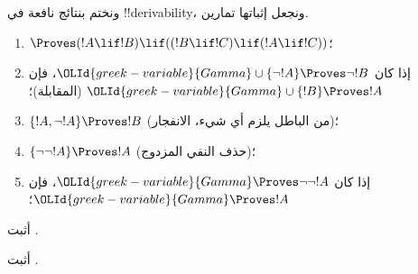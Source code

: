 \documentclass[../../../include/open-logic-section]{subfiles}
\begin{document}
ونختم بنتائج نافعة في !!{derivability}، ونجعل إثباتها تمارين.

\begin{prop}
\begin{enumerate}
\item $\Proves (!A \lif !B) \lif ((!B \lif !C)
  \lif (!A \lif !C))$؛ 
\item إذا كان $\OLId{greek-variable}{Gamma} \cup \{ \lnot !A\}
  \Proves \lnot !B$، فإن $\OLId{greek-variable}{Gamma} \cup \{ !B\} \Proves
  !A$ (المقابلة)؛ 
\item  $\{ !A, \lnot!A\} \Proves
    !B$ (من الباطل يلزم أي شيء، الانفجار)؛ 
\item  $\{ \lnot\lnot!A\} \Proves
  !A$ (حذف النفي المزدوج)؛
\item إذا كان $\OLId{greek-variable}{Gamma} \Proves \lnot\lnot!A$، فإن $\OLId{greek-variable}{Gamma} \Proves
  !A$؛
\end{enumerate}
\end{prop}

\begin{prob}
  أثبت .
\end{prob}
\tagendprob

\begin{prob}
  أثبت .
\end{prob}
\tagendprob
\end{document}
